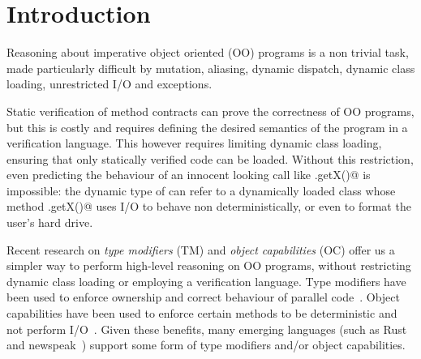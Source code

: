 
\section{Introduction}
\saveSpace\saveSpace

Reasoning about imperative object oriented (OO) programs is a non trivial task,
made particularly difficult by mutation, aliasing, dynamic dispatch, dynamic class loading,
unrestricted I/O and exceptions.

Static verification of method contracts can prove the correctness of OO programs, but this is costly and requires defining the desired semantics of the program in a verification language.
This however requires limiting dynamic class loading, ensuring that only statically verified code can be loaded.
Without this restriction, even predicting the behaviour of an innocent looking call like 
\Q@myPoint.getX()@ is impossible: the dynamic type of \Q@myPoint@ can refer to a dynamically loaded class
whose method \Q@.getX()@ uses I/O to behave non deterministically, or even to format the user’s hard drive.

Recent research on \emph{type modifiers} (TM) and \emph{object capabilities} (OC) offer us a simpler way to perform high-level reasoning on OO programs, without restricting dynamic class loading or employing a verification language.
Type modifiers have been used to enforce ownership and  correct behaviour of parallel code~\cite{GordonEtAl12,clebsch2015deny,clebsch2017orca}. Object capabilities have been used to enforce certain methods to be deterministic and not perform I/O~\cite{finifter2008verifiable}.
Given these benefits, many emerging languages (such as Rust~\cite{matsakis2014rust} and newspeak~\cite{bracha2010modules})
support some form of type modifiers and/or object capabilities.

